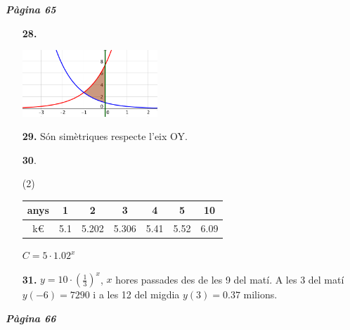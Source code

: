\documentclass[a4paper, pdf, twoside]{book}
\begin{document}
\begin{multicols}{2}
{\textbf{\em Pàgina 65}} \hrulefill
\begin{enumerate}
\vspace{0.25cm}
\item[\fontfamily{phv}\selectfont\color{blue}\textbf{28. }] 
\mbox {}\par \includegraphics [width=0.4\textwidth ]{img-sol/t5-28}
 \end{enumerate}
\begin{enumerate}
\vspace{0.25cm}
\item[\fontfamily{phv}\selectfont\color{blue}\textbf{29. }] 
Són simètriques respecte l'eix OY.
\vspace{0.25cm}



 \item[\fontfamily{phv}\selectfont\color{blue}\textbf{30}. ] 
 \begin{tasks}[column-sep=1em, item-indent=1.3333em](2)
	 \task* \mbox {}\par \begin {tabular}{|c|c|c|c|c|c|c|} anys & 1 & 2 & 3 & 4 & 5 & 10 \\ \hline k\euro {} & 5.1 & 5.202 & 5.306 & 5.41 & 5.52 & 6.09 \end {tabular}
	 \task $C=5\cdot 1.02^x$ 
\end{tasks}
\vspace{0.25cm}
\item[\fontfamily{phv}\selectfont\color{blue}\textbf{31. }] 
$y=10\cdot \left (\frac {1}{3}\right )^x$, $x$ hores passades des de les 9 del matí. A les 3 del matí $y(-6)=7290$ i a les 12 del migdia $y(3)=0.37$ milions.
 \end{enumerate}
\vspace{0.3cm}


{\textbf{\em Pàgina 66}} \hrulefill
\begin{enumerate}
\vspace{0.25cm}




\end{enumerate}
\end{multicols}
\end{document}
